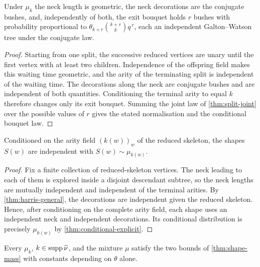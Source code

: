\begin{lemma}
\label{thm:conditional-explicit}
\leanok
{}
Under $\mu_k$ the neck length is geometric, the neck decorations are the conjugate bushes, and,
independently of both, the exit bouquet holds $r$ bushes with probability proportional to
$\theta_{k+r}\binom{k+r}{k}q^{\,r}$, each an independent Galton--Watson tree under the conjugate
law.
\end{lemma}

\begin{proof}
\leanok
{}
Starting from one split, the successive reduced vertices are unary until the first vertex with at
least two children. Independence of the offspring field makes this waiting time geometric, and
the arity of the terminating split is independent of the waiting time. The decorations along the
neck are conjugate bushes and are independent of both quantities. Conditioning the terminal arity
to equal $k$ therefore changes only its exit bouquet. Summing the joint law of
\cref{thm:split-joint} over the possible values of $r$ gives the stated normalisation and the
conditional bouquet law.
\end{proof}

\begin{lemma}
\label{thm:conditional-iid}
\leanok
{}
Conditioned on the arity field $(k(w))_w$ of the reduced skeleton, the shapes $S(w)$ are
independent with $S(w)\sim\mu_{k(w)}$.
\end{lemma}

\begin{proof}
\leanok
{}
Fix a finite collection of reduced-skeleton vertices. The neck leading to each of them is explored
inside a disjoint descendant subtree, so the neck lengths are mutually independent and independent
of the terminal arities. By \cref{thm:harris-general}, the decorations are independent given the
reduced skeleton. Hence, after conditioning on the complete arity field, each shape uses an
independent neck and independent decorations. Its conditional distribution is precisely
$\mu_{k(w)}$ by \cref{thm:conditional-explicit}.
\end{proof}

\begin{lemma}
\label{thm:mass-uniform}
Every $\mu_k$, $k\in\operatorname{supp}\widetilde\nu$, and the mixture $\mu$ satisfy the two bounds of
\cref{thm:shape-mass} with constants depending on $\theta$ alone.
\end{lemma}

